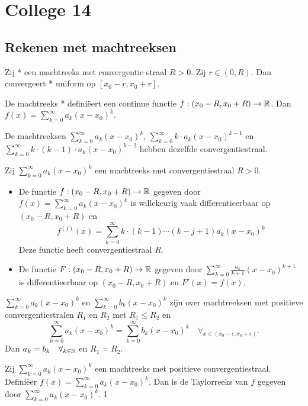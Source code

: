\documentclass[week=1]{homework}
\begin{document}
	\newpage
	\section*{College 14}
	
	\subsection*{Rekenen met machtreeksen}
	 Zij * een machtreeks met convergentie straal $R > 0$. Zij $r \in (0,R)$. Dan convergeert * uniform op $[x_0 - r, x_0 + r]$. 
	
	 De machtreeks * defini\"eert een continue functie $f: (x_0 - R, x_0 + R) \to \mathbb{R}$. Dan $f(x) = \sum_{k = 0}^{\infty} a_k (x - x_0)^k$. 
	
	\Stel De machtreeksen $\sum_{k = 0}^{\infty} a_k (x - x_0)^k$, $\sum_{k = 0}^{\infty}k \cdot  a_k (x - x_0)^{k-1}$ en $\sum_{k = 0}^{\infty} k \cdot (k-1) \cdot a_k (x - x_0)^{k-2}$ hebben dezelfde convergentiestraal. 
	
	\Stel Zij $\sum_{k = 0}^{\infty} a_k (x - x_0)^k$ een machtreeks met convergentiestraal $R > 0$. 
	\begin{itemize}
		\item De functie $f: (x_0 - R, x_0 + R) \to \mathbb{R}$ gegeven door $f(x) = \sum_{k = 0}^{\infty} a_k (x - x_0)^k$ is willekeurig vaak differentieerbaar op $(x_0 - R, x_0 + R)$ en 
		\[
			f^{(j)} (x) = \sum_{k = 0}^{\infty} k \cdot (k-1) \cdots (k - j + 1) a_k (x - x_0)^k
		\]
		Deze functie heeft convergentiestraal $R$. 
		\item De functie $F : (x_0 - R, x_0 + R) \to \mathbb{R}$ gegeven door $\sum_{k = 0}^{\infty} \frac{a_k}{k+1} (x - x_0)^{k+1}$ is differentieerbaar op $(x_0 - R, x_0 + R)$ en $F'(x) = f(x)$. 
 	\end{itemize}
 	
 	\Stel[Identiteitsstelling] $\sum_{k = 0}^{\infty} a_k (x - x_0)^k$ en $\sum_{k = 0}^{\infty} b_k (x - x_0)^k$ zijn over machtreeksen met positieve convergentiestralen $R_1$ en $R_2$ met $R_1 \le R_2$ en 
 	\[
	 	\sum_{k = 0}^{\infty} a_k (x - x_0)^k = \sum_{k = 0}^{\infty} b_k (x - x_0)^k \quad \forall_{x \in (x_0 - \epsilon, x_0 + \epsilon)}.
 	\]
 	Dan $a_k = b_k \quad \forall_{k \in \mathbb{N}}$ en $R_1 = R_2$. 
 	
 	\Stel Zij $\sum_{k = 0}^{\infty} a_k (x - x_0)^k$ een machtreeks met positieve convergentiestraal. Defini\"eer $f(x) = \sum_{k = 0}^{\infty} a_k (x - x_0)^k$. Dan is de Taylorreeks van $f$ gegeven door $\sum_{k = 0}^{\infty} a_k (x - x_0)^k$. 1
	
	
	
\end{document}
